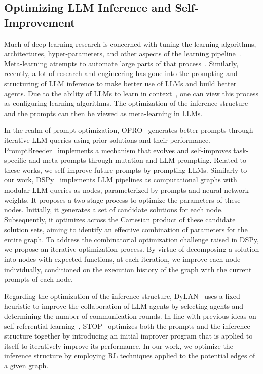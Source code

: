 \documentclass{article}
\theoremstyle{plain}
\theoremstyle{definition}
\theoremstyle{remark}
\begin{document}
\subsection{Optimizing LLM Inference and Self-Improvement}
Much of deep learning research is concerned with tuning the learning algorithms, architectures, hyper-parameters, and other aspects of the learning pipeline~\citep{schmidhuber2015deep,yan2015deep}.
Meta-learning attempts to automate large parts of that process~\citep{schmidhuber1987evolutionary,elsken2019neural,kirsch2020meta}.
Similarly, recently, a lot of research and engineering has gone into the prompting and structuring of LLM inference to make better use of LLMs and build better agents.
Due to the ability of LLMs to learn in context~\citep{brown2020language,kirsch2022general}, one can view this process as configuring learning algorithms.
The optimization of the inference structure and the prompts can then be viewed as meta-learning in LLMs.

In the realm of prompt optimization, OPRO~\citep{yang2023large} generates better prompts through iterative LLM queries using prior solutions and their performance.
PromptBreeder~\citep{fernando2023promptbreeder} implements a mechanism that evolves and self-improves task-specific and meta-prompts through mutation and LLM prompting.
Related to these works, we self-improve future prompts by prompting LLMs.
Similarly to our work, DSPy~\citep{khattab2023dspy} implements LLM pipelines as computational graphs with modular LLM queries as nodes, parameterized by prompts and neural network weights. 
It proposes a two-stage process to optimize the parameters of these nodes.
Initially, it generates a set of candidate solutions for each node.
Subsequently, it optimizes across the Cartesian product of these candidate solution sets, aiming to identify an effective combination of parameters for the entire graph.
To address the combinatorial optimization challenge raised in DSPy, we propose an iterative optimization process.
By virtue of decomposing a solution into nodes with expected functions, at each iteration, we improve each node individually, conditioned on the execution history of the graph with the current prompts of each node. 


Regarding the optimization of the inference structure, DyLAN~\citep{liu2023dynamic} uses a fixed heuristic to improve the collaboration of LLM agents by selecting agents and determining the number of communication rounds.
In line with previous ideas on self-referential learning~\citep{schmidhuber1993self,irie2022modern,kirsch2022eliminating}, STOP~\citep{zelikman2023self} optimizes both the prompts and the inference structure together by introducing an initial improver program that is applied to itself to iteratively improve its performance.
In our work, we optimize the inference structure by employing RL techniques applied to the potential edges of a given graph.
\end{document}
